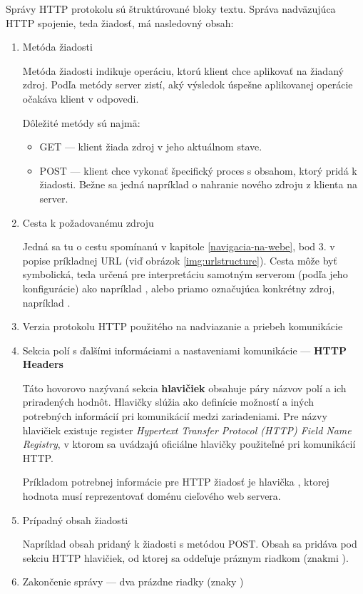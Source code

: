 Správy HTTP protokolu sú štruktúrované bloky textu.
Správa nadväzujúca HTTP spojenie, teda žiadosť, má nasledovný obsah:
\begin{enumerate}
    \item Metóda žiadosti

    Metóda žiadosti indikuje operáciu, ktorú klient chce aplikovať na žiadaný zdroj.
    Podľa metódy server zistí, aký výsledok úspešne aplikovanej operácie očakáva klient v odpovedi.

    Dôležité metódy sú najmä:
    \begin{itemize}
        \item GET --- klient žiada zdroj v jeho aktuálnom stave. 
        \item POST --- klient chce vykonať špecifický proces s obsahom, ktorý pridá k žiadosti. 
        Bežne sa jedná napríklad o nahranie nového zdroju z klienta na server.
    \end{itemize}
    
    \item Cesta k požadovanému zdroju

    Jedná sa tu o cestu spomínanú v kapitole \ref{navigacia-na-webe}, bod 3. v popise príkladnej URL (viď obrázok \ref{img:urlstructure}).
    Cesta môže byť symbolická, teda určená pre interpretáciu samotným serverom (podľa jeho konfigurácie) ako napríklad , alebo priamo označujúca konkrétny zdroj, napríklad .  
 
    \item Verzia protokolu HTTP použitého na nadviazanie a priebeh komunikácie
    
    \item Sekcia polí s ďalšími informáciami a nastaveniami komunikácie --- \textbf{HTTP Headers}
    
    Táto hovorovo nazývaná sekcia \textbf{hlavičiek} obsahuje páry názvov polí a ich priradených hodnôt. 
    Hlavičky slúžia ako definície možností a iných potrebných informácií pri komunikácií medzi zariadeniami.
    Pre názvy hlavičiek existuje register \textit{Hypertext Transfer Protocol (HTTP) Field Name Registry},
    v ktorom sa uvádzajú oficiálne hlavičky použiteľné pri komunikácií HTTP. 

    Príkladom potrebnej informácie pre HTTP žiadosť je hlavička , ktorej hodnota musí reprezentovať doménu cieľového web servera. 
    
    \item Prípadný obsah žiadosti

    Napríklad obsah pridaný k žiadosti s metódou POST. 
    Obsah sa pridáva pod sekciu HTTP hlavičiek, od ktorej sa oddeľuje práznym riadkom (znakmi ).

    \item Zakončenie správy --- dva prázdne riadky (znaky )

\end{enumerate}


